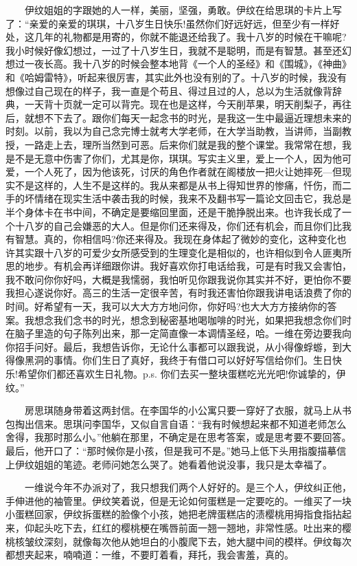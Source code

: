 \documentclass[12pt,UTF8]{ctexbook}
\begin{document}
　　伊纹姐姐的字跟她的人一样，美丽，坚强，勇敢。伊纹在给思琪的卡片上写了：\enquote{亲爱的亲爱的琪琪，十八岁生日快乐!虽然你们好远好远，但至少有一样好处，这几年的礼物都是用寄的，你就不能退还给我了。我十八岁的时候在干嘛呢?我小时候好像幻想过，一过了十八岁生日，我就不是聪明，而是有智慧。甚至还幻想过一夜长高。我十八岁的时候会整本地背《一个人的圣经》和《围城》，《神曲》和《哈姆雷特》，听起来很厉害，其实此外也没有别的了。十八岁的时候，我没有想像过自己现在的样子，我一直是个苟且、得过且过的人，总以为生活就像背辞典，一天背十页就一定可以背完。现在也是这样，今天削苹果，明天削梨子，再往后，就想不下去了。跟你们每天一起念书的时光，是我这一生中最逼近理想未来的时刻。以前，我以为自己念完博士就考大学老师，在大学当助教，当讲师，当副教授，一路走上去，理所当然到可恶。后来你们就是我的整个课堂。我常常在想，我是不是无意中伤害了你们，尤其是你，琪琪。写实主义里，爱上一个人，因为他可爱，一个人死了，因为他该死，讨厌的角色作者就在阁楼放一把火让她摔死---但现实不是这样的，人生不是这样的。我从来都是从书上得知世界的惨痛，忏伤，而二手的坏情绪在现实生活中袭击我的时候，我来不及翻书写一篇论文回击它，我总是半个身体卡在书中间，不确定是要缩回里面，还是干脆挣脱出来。也许我长成了一个十八岁的自己会嫌恶的大人。但是你们还来得及，你们还有机会，而且你们比我有智慧。真的，你相信吗?你还来得及。我现在身体起了微妙的变化，这种变化也许其实跟十八岁的可爱少女所感受到的生理变化是相似的，也许相似到令人匪夷所思的地步。有机会再详细跟你讲。我好喜欢你打电话给我，可是有时我又会害怕，我不敢问你你好吗，大概是我懦弱，我怕听见你跟我说你其实并不好，更怕你不要我担心遂说你好。高三的生活一定很辛苦，有时我还害怕你跟我讲电话浪费了你的时间。好希望有一天，我可以大大方方地问你，你好吗?也大大方方接纳你的答案。我想念我们念书的时光，想念到秘密基地喝咖啡的时光，如果把我想念你们时在脑子里造的句子陈列出来，那一定简直像一本调情圣经，哈。一维在旁边要我向你招手问好。最后，我想告诉你，无论什么事都可以跟我说，从小得像蜉蝣，到大得像黑洞的事情。你们生日了真好，我终于有借口可以好好写信给你们。生日快乐!希望你们都还喜欢生日礼物。p.s. 你们去买一整块蛋糕吃光光吧!你诚挚的，伊纹。}

　　房思琪随身带着这两封信。在李国华的小公寓只要一穿好了衣服，就马上从书包掏出信来。思琪问李国华，又似自言自语：\enquote{我有时候想起来都不知道老师怎么舍得，我那时那么小。}他躺在那里，不确定是在思考答案，或是思考要不要回答。最后，他开口了：\enquote{那时候你是小孩，但是我可不是。}她马上低下头用指腹描摹信上伊纹姐姐的笔迹。老师问她怎么哭了。她看着他说没事，我只是太幸福了。

　　一维说今年不办派对了，我只想我们两个人好好的。是三个人，伊纹纠正他，手伸进他的袖管里。伊纹笑着说，但是无论如何蛋糕是一定要吃的。一维买了一块小蛋糕回家，伊纹拆蛋糕的脸像个小孩，她把老牌蛋糕店的渍樱桃用拇指食指拈起来，仰起头吃下去，红红的樱桃梗在嘴唇前面一翘一翘地，非常性感。吐出来的樱桃核皱纹深刻，就像每次他从她坦白的小腹爬下去，她大腿中间的模样。伊纹每次都想夹起来，喃喃道：一维，不要盯着看，拜托，我会害羞，真的。
\end{document}
